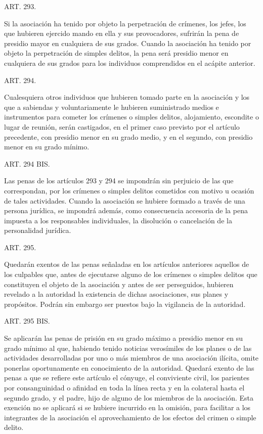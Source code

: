     ART. 293.

    Si la asociación ha tenido por objeto la perpetración de crímenes, los jefes, los que hubieren ejercido mando en ella y sus provocadores, sufrirán la pena de presidio mayor en cualquiera de sus grados.
    Cuando la asociación ha tenido por objeto la perpetración de simples delitos, la pena será presidio menor en cualquiera de sus grados para los individuos comprendidos en el acápite anterior.


    ART. 294.

    Cualesquiera otros individuos que hubieren tomado parte en la asociación y los que a sabiendas y voluntariamente le hubieren suministrado medios e instrumentos para cometer los crímenes o simples delitos, alojamiento, escondite o lugar de reunión, serán castigados, en el primer caso previsto por el artículo precedente, con presidio menor en su grado medio, y en el segundo, con presidio menor en su grado mínimo.



    ART. 294 BIS.
   
    Las penas de los artículos 293 y 294 se impondrán sin perjuicio de las que correspondan, por los crímenes o simples delitos cometidos con motivo u ocasión de tales actividades.
    Cuando la asociación se hubiere formado a través de una persona jurídica, se impondrá además, como consecuencia accesoria de la pena impuesta a los responsables individuales, la disolución o cancelación de la personalidad jurídica.



    ART. 295.

    Quedarán exentos de las penas señaladas en los artículos anteriores aquellos de los culpables que, antes de ejecutarse alguno de los crímenes o simples delitos que constituyen el objeto de la asociación y antes de ser perseguidos, hubieren revelado a la autoridad la existencia de dichas asociaciones, sus planes y propósitos.
    Podrán sin embargo ser puestos bajo la vigilancia de la autoridad.


    ART. 295 BIS.

    Se aplicarán las penas de prisión en su grado máximo a presidio menor en su grado mínimo al que, habiendo tenido noticias verosímiles de los planes o de las actividades desarrolladas por uno o más miembros de una asociación ilícita, omite ponerlas oportunamente en conocimiento de la autoridad.
    Quedará exento de las penas a que se refiere este artículo el cónyuge, el conviviente civil, los parientes por consanguinidad o afinidad en toda la línea recta y en la colateral hasta el segundo grado, y el padre, hijo de alguno de los miembros de la asociación. Esta exención no se aplicará si se hubiere incurrido en la omisión, para facilitar a los integrantes de la asociación el aprovechamiento de los efectos del crimen o simple delito.




